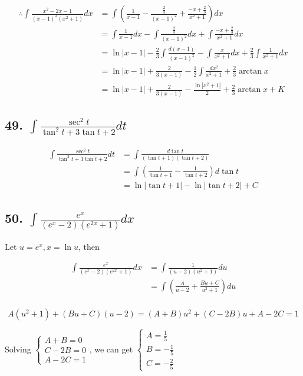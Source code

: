 \documentclass{article}
\begin{document}
    $$\begin{aligned}
        \therefore \int \frac{x^2 - 2x - 1}{(x - 1)^2(x^2 + 1)}dx &= \int(\frac{1}{x - 1} - \frac{\frac 2 3}{(x - 1)^2} + \frac{-x + \frac 2 3}{x^2 + 1}) dx \\
        &= \int\frac{1}{x - 1} dx - \int \frac{\frac 2 3}{(x - 1)^2}dx + \int \frac{-x + \frac 2 3}{x^2 + 1} dx \\
        &= \ln|x - 1| - \frac 2 3 \int \frac{d(x - 1)}{(x - 1)^2} - \int \frac{x}{x^2 + 1} dx + \frac 2 3 \int \frac{1}{x^2 + 1} dx \\
        &= \ln|x - 1| + \frac{2}{3(x - 1)} - \frac 1 2 \int \frac{dx^2}{x^2 + 1} + \frac 2 3 \arctan x \\
        &= \ln|x - 1| + \frac{2}{3(x - 1)} - \frac{\ln|x^2 + 1|}{2} + \frac 2 3 \arctan x + K
    \end{aligned}$$

    \subsection*{49. $\int \frac{\sec^2 t}{\tan^2 t + 3\tan t + 2} dt$}

    $$\begin{aligned}
        \int \frac{\sec^2 t}{\tan^2 t + 3\tan t + 2} dt &= \int \frac{d \tan t}{(\tan t + 1)(\tan t + 2)} \\
        &= \int (\frac{1}{\tan t + 1} - \frac{1}{\tan t + 2}) d \tan t \\
        &= \ln|\tan t + 1| - \ln |\tan t + 2| + C
    \end{aligned}$$

    \subsection*{50. $\int \frac{e^x}{(e^x - 2)(e^{2x} + 1)} dx$}

    Let $u = e^x, x = \ln u$, then

    $$\begin{aligned}
        \int \frac{e^x}{(e^x - 2)(e^{2x} + 1)} dx &= \int \frac{1}{(u - 2)(u^2 + 1)}du \\
        &= \int (\frac{A}{u - 2} + \frac{Bu + C}{u^2 + 1}) du \\
    \end{aligned}$$

    $$A(u^2 + 1) + (Bu + C)(u - 2) = (A + B)u^2 + (C - 2B)u + A - 2C = 1$$

    Solving $\left\{ \begin{array}{ll}
        A + B = 0 \\
        C - 2B = 0 \\
        A - 2C = 1
    \end{array} \right.$, we can get $\left\{ \begin{array}{ll}
        A = \frac 1 5 \\
        B = -\frac 1 5 \\
        C = -\frac 2 5
    \end{array} \right.$
\end{document}

